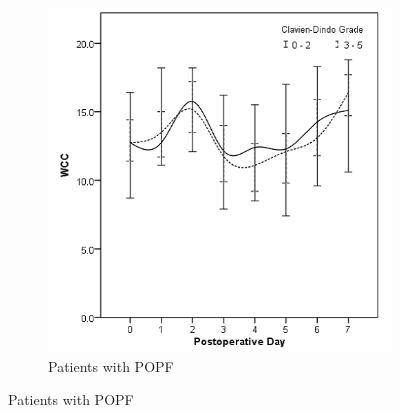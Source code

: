 \begin{figure}[t]
\begin{subfigure}{0.48\textwidth}
		\includegraphics[width=\textwidth]{Figures/crp_comp_WCC_infective_leak1}
		\caption{Patients with POPF}
		\label{fig:crp_comp_WCC_infective_leak1}
	\end{subfigure}
\end{figure}
\vfill



